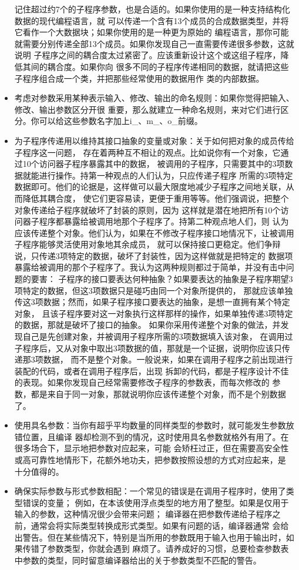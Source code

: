 \documentclass{article}
\begin{document}
\begin{itemize}
    记住超过约7个的子程序参数，也是合适的。如果你使用的是一种支持结构化数据的现代编程语言，就
    可以传递一个含有13个成员的合成数据类型，并将它看作一个大数据块；如果你使用的是一种更为原始的
    编程语言，那你可能就需要分别传递全部13个成员。如果你发现自己一直需要传递很多参数，这就说明
    子程序之间的耦合度太过紧密了。应该重新设计这个或这组子程序，降低其间的耦合度。如果你向
    很多不同的子程序传递相同的数据，就请把这些子程序组合成一个类，并把那些经常使用的数据用作
    类的内部数据。
    \item 考虑对参数采用某种表示输入、修改、输出的命名规则：如果你觉得把输入、修改、输出参数区分开很
    重要，那么就建立一种命名规则，来对它们进行区分。你可以给这些参数名字加上i\_、m\_、o\_前缀。
    \item 为子程序传递用以维持其接口抽象的变量或对象：关于如何把对象的成员传给子程序这一问题，
    存在着两种互不相让的观点。比如说你有一个对象，它通过10个访问器子程序暴露其中的数据，
    被调用的子程序，只需要其中的3项数据就能进行操作。持第一种观点的人们认为，只应传递子程序
    所需的3项特定数据即可。他们的论据是，这样做可以最大限度地减少子程序之间地关联，从而降低其耦合度，
    使它们更容易读，更便于重用等等。他们强调说，把整个对象传递给子程序就破坏了封装的原则，因为
    这样就是潜在地把所有10个访问器子程序都暴露给被调用地那个子程序了。持第二种观点地人们，则
    认为应该传递整个对象。他们认为，如果在不修改子程序接口地情况下，让被调用子程序能够灵活使用对象地其余成员，
    就可以保持接口更稳定。他们争辩说，只传递3项特定的数据，破坏了封装性，因为这样做就是把特定的
    数据项暴露给被调用的那个子程序了。我认为这两种规则都过于简单，并没有击中问题的要害：
    子程序的接口要表达何种抽象？如果要表达的抽象是子程序期望3项特定的数据，但这3项数据只是碰巧由同一个对象所提供的，
    那就应该单独传这3项数据；然而，如果子程序接口要表达的抽象，是想一直拥有某个特定对象，
    且该子程序要对这一对象执行这样那样的操作，如果单独传递3项特定的数据，那就是破坏了接口的抽象。
    如果你采用传递整个对象的做法，并发现自己是先创建对象，并被调用子程序所需的3项数据填入该对象，
    在调用过子程序后，又从对象中取出3项数据的值，那就是一个证据，说明你应该只传递那3项数据，
    而不是整个对象。一般说来，如果在调用子程序之前出现进行装配的代码，或者在调用子程序后，出现
    拆卸的代码，都是子程序设计不佳的表现。如果你发现自己经常需要修改子程序的参数表，而每次修改的
    参数，都是来自于同一对象，那就说明你应该传递整个对象，而不是个别数据了。
    \item 使用具名参数：当你有超乎平均数量的同样类型的参数时，就可能发生参数放错位置，且编译
    器却检测不到的情况，这时使用具名参数就格外有用了。在很多场合下，显示地把参数对应起来，可能
    会矫枉过正，但在需要高安全性或高可靠性地情形下，花额外地功夫，把参数按照设想的方式对应起来，是
    十分值得的。
    \item 确保实际参数与形式参数相配：一个常见的错误是在调用子程序时，使用了类型错误的变量；
    例如，在本该使用浮点类型的地方用了整型。如果是仅用于输入的参数，这种情况很少会带来问题；
    编译器在把参数传递给子程序之前，通常会将实际类型转换成形式类型。如果有问题的话，编译器通常
    会给出警告。但在某些情况下，特别是当所用的参数既用于输入也用于输出时，如果传错了参数类型，你就会遇到
    麻烦了。请养成好的习惯，总要检查参数表中参数的类型，同时留意编译器给出的关于参数类型不匹配的警告。
\end{itemize}
\end{document}
